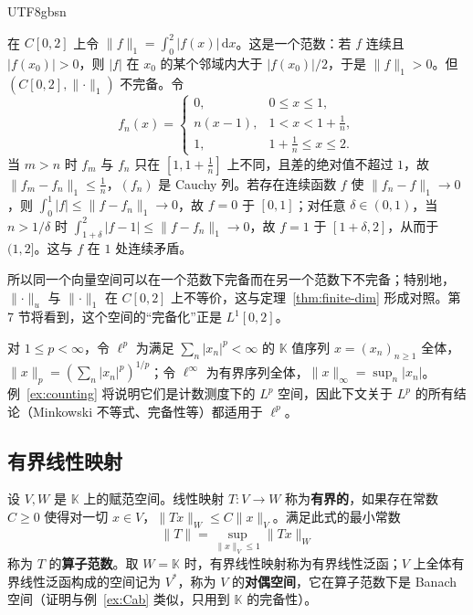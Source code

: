 \documentclass[11pt]{article}
\newcommand{\K}{\mathbb{K}}
\newcommand{\norm}[1]{\lVert #1\rVert}
\newcommand{\dx}{\,\mathrm{d}x}
\begin{document}
\begin{CJK*}{UTF8}{gbsn}
\begin{example}[同一空间上的不完备范数]\label{ex:C-L1}
在 $C[0,2]$ 上令 $\norm{f}_{1}=\int_{0}^{2}|f(x)|\dx$。这是一个范数：若 $f$ 连续且 $|f(x_{0})|>0$，则 $|f|$ 在 $x_{0}$ 的某个邻域内大于 $|f(x_{0})|/2$，于是 $\norm{f}_{1}>0$。但 $(C[0,2],\norm{\cdot}_{1})$ 不完备。令
\[
f_{n}(x)=\begin{cases}0,&0\le x\le1,\\ n(x-1),&1<x<1+\tfrac1n,\\ 1,&1+\tfrac1n\le x\le2.\end{cases}
\]
当 $m>n$ 时 $f_{m}$ 与 $f_{n}$ 只在 $[1,1+\frac1n]$ 上不同，且差的绝对值不超过 $1$，故 $\norm{f_{m}-f_{n}}_{1}\le\frac1n$，$(f_{n})$ 是 Cauchy 列。若存在连续函数 $f$ 使 $\norm{f_{n}-f}_{1}\to0$，则 $\int_{0}^{1}|f|\le\norm{f-f_{n}}_{1}\to0$，故 $f=0$ 于 $[0,1]$；对任意 $\delta\in(0,1)$，当 $n>1/\delta$ 时 $\int_{1+\delta}^{2}|f-1|\le\norm{f-f_{n}}_{1}\to0$，故 $f=1$ 于 $[1+\delta,2]$，从而于 $(1,2]$。这与 $f$ 在 $1$ 处连续矛盾。

所以同一个向量空间可以在一个范数下完备而在另一个范数下不完备；特别地，$\norm{\cdot}_{u}$ 与 $\norm{\cdot}_{1}$ 在 $C[0,2]$ 上不等价，这与定理~\ref{thm:finite-dim} 形成对照。第 7 节将看到，这个空间的“完备化”正是 $L^{1}[0,2]$。
\end{example}

\begin{example}[序列空间]\label{ex:lp}
对 $1\le p<\infty$，令 $\ell^{p}$ 为满足 $\sum_{n}|x_{n}|^{p}<\infty$ 的 $\K$ 值序列 $x=(x_{n})_{n\ge1}$ 全体，$\norm{x}_{p}=(\sum_{n}|x_{n}|^{p})^{1/p}$；令 $\ell^{\infty}$ 为有界序列全体，$\norm{x}_{\infty}=\sup_{n}|x_{n}|$。例~\ref{ex:counting} 将说明它们是计数测度下的 $L^{p}$ 空间，因此下文关于 $L^{p}$ 的所有结论（Minkowski 不等式、完备性等）都适用于 $\ell^{p}$。
\end{example}

\subsection{有界线性映射}

\begin{definition}
设 $V,W$ 是 $\K$ 上的赋范空间。线性映射 $T:V\to W$ 称为\textbf{有界的}，如果存在常数 $C\ge0$ 使得对一切 $x\in V$，$\norm{Tx}_{W}\le C\norm{x}_{V}$。满足此式的最小常数
\[
\norm{T}=\sup_{\norm{x}_{V}\le1}\norm{Tx}_{W}
\]
称为 $T$ 的\textbf{算子范数}。取 $W=\K$ 时，有界线性映射称为有界线性泛函；$V$ 上全体有界线性泛函构成的空间记为 $V^{*}$，称为 $V$ 的\textbf{对偶空间}，它在算子范数下是 Banach 空间（证明与例~\ref{ex:Cab} 类似，只用到 $\K$ 的完备性）。
\end{definition}


\end{CJK*}
\end{document}
